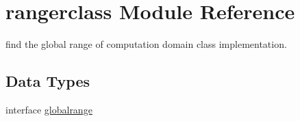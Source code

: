 \hypertarget{namespacerangerclass}{}\section{rangerclass Module Reference}
\label{namespacerangerclass}


find the global range of computation domain class implementation.  


\subsection*{Data Types}
\begin{DoxyCompactItemize}
\item 
interface \mbox{\hyperlink{interfacerangerclass_1_1globalrange}{globalrange}}
\end{DoxyCompactItemize}
